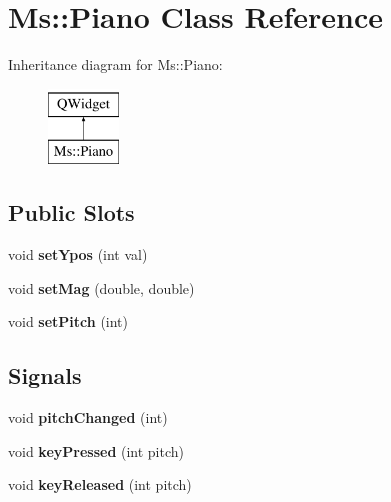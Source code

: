 \hypertarget{class_ms_1_1_piano}{}\section{Ms\+:\+:Piano Class Reference}
\label{class_ms_1_1_piano}
Inheritance diagram for Ms\+:\+:Piano\+:\begin{figure}[H]
\begin{center}
\leavevmode
\includegraphics[height=2.000000cm]{class_ms_1_1_piano}
\end{center}
\end{figure}
\subsection*{Public Slots}
\begin{DoxyCompactItemize}
\item 
\mbox{\label{class_ms_1_1_piano_a3de14a694969e37a75aae179d652e6b7}} 
void {\bfseries set\+Ypos} (int val)
\item 
\mbox{\label{class_ms_1_1_piano_ab40723891d49fe2c3d0e449b4e9daf8f}} 
void {\bfseries set\+Mag} (double, double)
\item 
\mbox{\label{class_ms_1_1_piano_a83e8a03ca43248605c197b1e00e87499}} 
void {\bfseries set\+Pitch} (int)
\end{DoxyCompactItemize}
\subsection*{Signals}
\begin{DoxyCompactItemize}
\item 
\mbox{\label{class_ms_1_1_piano_a1da97d17c9cf8d97495baff1f2e0275f}} 
void {\bfseries pitch\+Changed} (int)
\item 
\mbox{\label{class_ms_1_1_piano_a1db1f0e06ec431114ff4e67351bf3df0}} 
void {\bfseries key\+Pressed} (int pitch)
\item 
\mbox{\label{class_ms_1_1_piano_a0da0439813790a8c8a6a12814cde1f26}} 
void {\bfseries key\+Released} (int pitch)
\end{DoxyCompactItemize}
